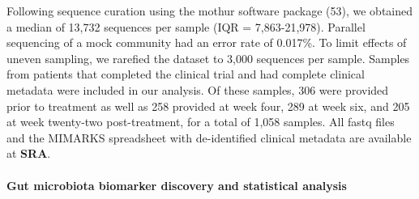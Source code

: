 \documentclass[12pt,]{article}
\let\oldparagraph\paragraph
\renewcommand{\paragraph}[1]{\oldparagraph{#1}\mbox{}}
\begin{document}
Following sequence curation using the mothur software package (53), we
obtained a median of 13,732 sequences per sample (IQR = 7,863-21,978).
Parallel sequencing of a mock community had an error rate of 0.017\%. To
limit effects of uneven sampling, we rarefied the dataset to 3,000
sequences per sample. Samples from patients that completed the clinical
trial and had complete clinical metadata were included in our analysis.
Of these samples, 306 were provided prior to treatment as well as 258
provided at week four, 289 at week six, and 205 at week twenty-two
post-treatment, for a total of 1,058 samples. All fastq files and the
MIMARKS spreadsheet with de-identified clinical metadata are available
at \textbf{SRA}.

\paragraph{Gut microbiota biomarker discovery and statistical
analysis}\label{gut-microbiota-biomarker-discovery-and-statistical-analysis}
\end{document}
